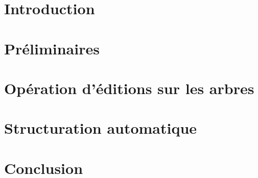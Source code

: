 \section{Introduction}


\section{Préliminaires}


\section{}


\section{Opération d'éditions sur les arbres}


\section{Structuration automatique}


\section{Conclusion}

